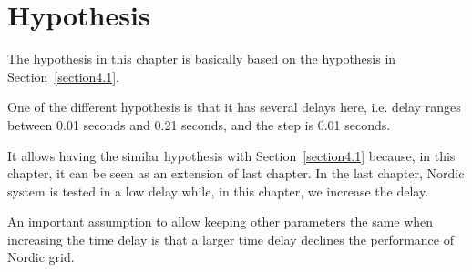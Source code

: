 \section{Hypothesis} %
The hypothesis in this chapter is basically based on the hypothesis in Section~\ref{section4.1}.  
 
One of the different hypothesis is that it has several delays here, i.e. delay ranges between 0.01 seconds and 0.21 seconds, and the step is 0.01 seconds.  

It allows having the similar hypothesis with Section~\ref{section4.1} because, in this chapter, it can be seen as an extension of last chapter. In the last chapter, Nordic system is tested in a low delay while, in this chapter, we increase the delay.  

An important assumption to allow keeping other parameters the same when increasing the time delay is that a larger time delay declines the performance of Nordic grid.
